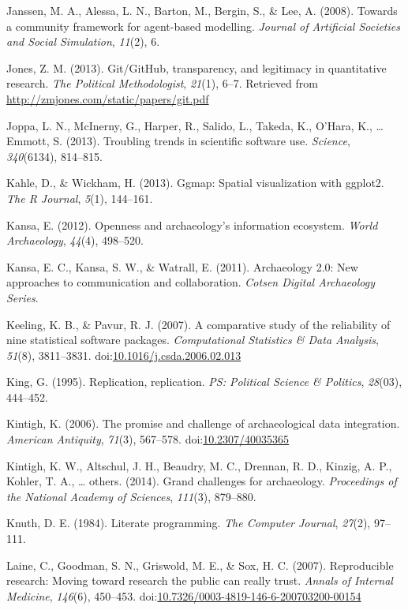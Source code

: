 \documentclass[american,man]{apa6}
\begin{document}
Janssen, M. A., Alessa, L. N., Barton, M., Bergin, S., \& Lee, A.
(2008). Towards a community framework for agent-based modelling.
\emph{Journal of Artificial Societies and Social Simulation},
\emph{11}(2), 6.

Jones, Z. M. (2013). Git/GitHub, transparency, and legitimacy in
quantitative research. \emph{The Political Methodologist}, \emph{21}(1),
6--7. Retrieved from \url{http://zmjones.com/static/papers/git.pdf}

Joppa, L. N., {McInerny}, G., Harper, R., Salido, L., Takeda, K.,
O'Hara, K., \ldots{} Emmott, S. (2013). Troubling trends in scientific
software use. \emph{Science}, \emph{340}(6134), 814--815.

Kahle, D., \& Wickham, H. (2013). Ggmap: Spatial visualization with
ggplot2. \emph{The R Journal}, \emph{5}(1), 144--161.

Kansa, E. (2012). Openness and archaeology's information ecosystem.
\emph{World Archaeology}, \emph{44}(4), 498--520.

Kansa, E. C., Kansa, S. W., \& Watrall, E. (2011). Archaeology 2.0: New
approaches to communication and collaboration. \emph{Cotsen Digital
Archaeology Series}.

Keeling, K. B., \& Pavur, R. J. (2007). A comparative study of the
reliability of nine statistical software packages. \emph{Computational
Statistics \& Data Analysis}, \emph{51}(8), 3811--3831.
doi:\href{http://dx.doi.org/10.1016/j.csda.2006.02.013}{10.1016/j.csda.2006.02.013}

King, G. (1995). Replication, replication. \emph{PS: Political Science
\& Politics}, \emph{28}(03), 444--452.

Kintigh, K. (2006). The promise and challenge of archaeological data
integration. \emph{American Antiquity}, \emph{71}(3), 567--578.
doi:\href{http://dx.doi.org/10.2307/40035365}{10.2307/40035365}

Kintigh, K. W., Altschul, J. H., Beaudry, M. C., Drennan, R. D., Kinzig,
A. P., Kohler, T. A., \ldots{} others. (2014). Grand challenges for
archaeology. \emph{Proceedings of the National Academy of Sciences},
\emph{111}(3), 879--880.

Knuth, D. E. (1984). Literate programming. \emph{The Computer Journal},
\emph{27}(2), 97--111.

Laine, C., Goodman, S. N., Griswold, M. E., \& Sox, H. C. (2007).
Reproducible research: Moving toward research the public can really
trust. \emph{Annals of Internal Medicine}, \emph{146}(6), 450--453.
doi:\href{http://dx.doi.org/10.7326/0003-4819-146-6-200703200-00154}{10.7326/0003-4819-146-6-200703200-00154}
\end{document}
